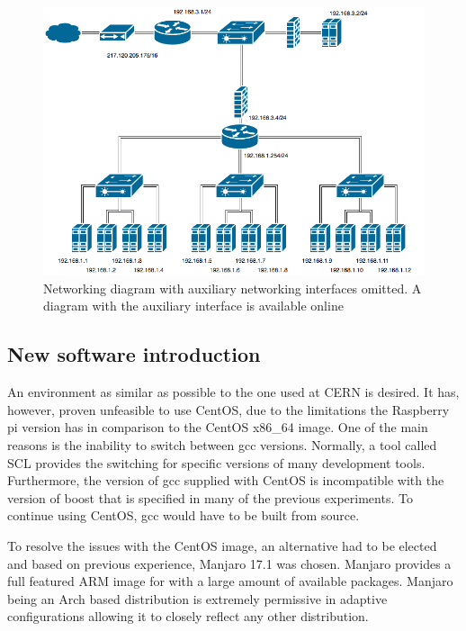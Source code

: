 \documentclass[]{article}
\begin{document}
\begin{center}
	\begin{figure}[H]
		\includegraphics[width=\textwidth]{images/network-primary}
		\caption{Networking diagram with auxiliary networking interfaces omitted. A diagram with the auxiliary interface is available online\cite{Auxiliary_network}}
		\label{fig:ssh}
	\end{figure}
\end{center}

\subsection{New software introduction}
An environment as similar as possible to the one used at CERN is desired. It has, however, proven unfeasible to use CentOS, due to the limitations the Raspberry pi version has in comparison to the CentOS x86\_64 image. One of the main reasons is the inability to switch between gcc versions. Normally, a tool called SCL provides the switching for specific versions of many development tools. Furthermore, the version of gcc supplied with CentOS is incompatible with the version of boost that is specified in many of the previous experiments. To continue using CentOS, gcc would have to be built from source.

To resolve the issues with the CentOS image, an alternative had to be elected and based on previous experience, Manjaro 17.1 was chosen. Manjaro provides a full featured ARM image for with a large amount of available packages. Manjaro being an Arch based distribution is extremely permissive in adaptive configurations allowing it to closely reflect any other distribution.
\end{document}
